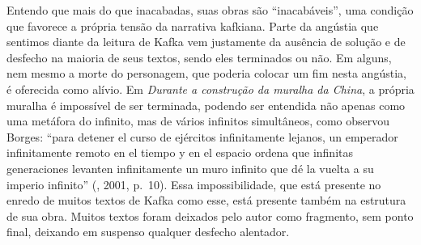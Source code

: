 Entendo que mais do que inacabadas, suas obras são ``inacabáveis'', uma
condição que favorece a própria tensão da narrativa kafkiana. Parte da
angústia que sentimos diante da leitura de Kafka vem justamente da
ausência de solução e de desfecho na maioria de seus textos, sendo eles
terminados ou não. Em alguns, nem mesmo a morte do personagem, que
poderia colocar um fim nesta angústia, é oferecida como alívio. Em
\emph{Durante a construção da muralha da China}, a própria muralha é
impossível de ser terminada, podendo ser entendida não apenas como uma
metáfora do infinito, mas de vários infinitos simultâneos, como observou
Borges: ``para detener el curso de ejércitos infinitamente lejanos, un
emperador infinitamente remoto en el tiempo y en el espacio ordena que
infinitas generaciones levanten infinitamente un muro infinito que dé la
vuelta a su imperio infinito'' (, 2001, p.~10). Essa
impossibilidade, que está presente no enredo de muitos textos de Kafka
como esse, está presente também na estrutura de sua obra. Muitos textos
foram deixados pelo autor como fragmento, sem ponto final, deixando em
suspenso qualquer desfecho alentador.

